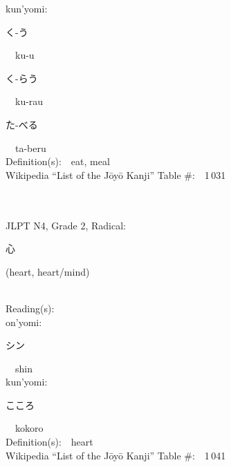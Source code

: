 \begin{multicols}{2}
{\hspace*{1em}}kun'yomi:\ \ \\
{\hspace*{2em}}{\begin{CJK}{UTF8}{min} く-う \end{CJK}}\ \ ku-u\ \ \\
{\hspace*{2em}}{\begin{CJK}{UTF8}{min} く-らう \end{CJK}}\ \ ku-rau\ \ \\
{\hspace*{2em}}{\begin{CJK}{UTF8}{min} た-べる \end{CJK}}\ \ ta-beru\ \ \\
Definition(s):\ \ eat, meal \\
Wikipedia ``List of the J\=oy\=o Kanji'' Table \#:\ \ 1\,031 \\
\ \ \\
{\fontsize{34pt}{40pt}  }\ \ \\  %
{JLPT N4, Grade 2, Radical:\ \ {\begin{CJK}{UTF8}{min} 心 \end{CJK}} (heart, heart/mind) } \\
Reading(s):\ \ \\
{\hspace*{1em}}on'yomi:\ \ \\
{\hspace*{2em}}{\begin{CJK}{UTF8}{min} シン \end{CJK}}\ \ shin\ \ \\
{\hspace*{1em}}kun'yomi:\ \ \\
{\hspace*{2em}}{\begin{CJK}{UTF8}{min} こころ \end{CJK}}\ \ kokoro\ \ \\
Definition(s):\ \ heart \\
Wikipedia ``List of the J\=oy\=o Kanji'' Table \#:\ \ 1\,041 \\
\ \ \\
{\fontsize{34pt}{40pt}  }\ \ \\  %

\end{multicols}

